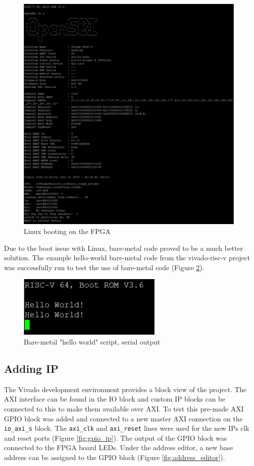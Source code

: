 \begin{figure}[H]
	\centering
	\includegraphics[scale=0.4]{linux.png}
	\caption{Linux booting on the FPGA}
	\label{fig:linux}
\end{figure}

Due to the boot issue with Linux, bare-metal code proved to be a much better solution. The example hello-world bare-metal code from the vivado-risc-v project was successfully run to test the use of bare-metal code (Figure \ref{fig:helloworld}).

\begin{figure}[H]
	\centering
	\includegraphics[scale=1]{bare-metal.png}
	\caption{Bare-metal "hello world" script, serial output}
	\label{fig:helloworld}
\end{figure}

\subsection{Adding IP}
The Vivado development environment provides a block view of the project. The AXI interface can be found in the IO block and custom IP blocks can be connected to this to make them available over AXI. To test this pre-made AXI GPIO block \cite{xilinx_gpio} was added and connected to a new master AXI connection on the \texttt{io\_axi\_s} block. The \texttt{axi\_clk} and \texttt{axi\_reset} lines were used for the new IPs clk and reset ports (Figure \ref{fig:gpio_ip}). The output of the GPIO block was connected to the FPGA board LEDs. Under the address editor, a new base address can be assigned to the GPIO block (Figure \ref{fig:address_editor}).

